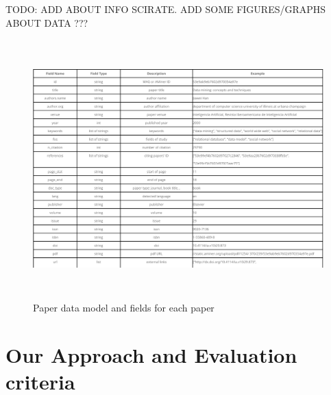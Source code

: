 \documentclass[a4paper, 11pt]{article}
\begin{document}
TODO: ADD ABOUT INFO  SCIRATE.
ADD SOME FIGURES/GRAPHS ABOUT DATA ???
\begin{figure}[h]
    \centering
    \includegraphics[width=15cm,height=10cm]{datamodel}
    \caption{Paper data model and fields for each paper \cite{data}}
    \label{fig:datamodel}
\end{figure}
\section{Our Approach and Evaluation criteria}
\end{document}
